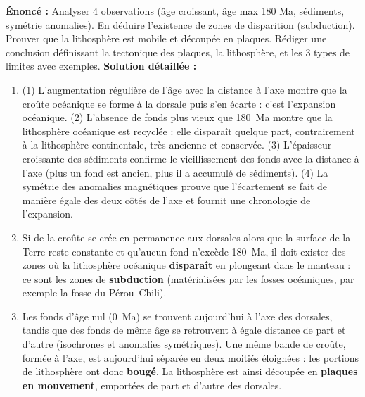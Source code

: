 \documentclass[11pt]{article}
\begin{document}
\begin{corrige}
\textbf{Énoncé :} Analyser 4 observations (âge croissant, âge max 180 Ma, sédiments, symétrie anomalies). En déduire l'existence de zones de disparition (subduction). Prouver que la lithosphère est mobile et découpée en plaques. Rédiger une conclusion définissant la tectonique des plaques, la lithosphère, et les 3 types de limites avec exemples.
\tcblower
\textbf{Solution détaillée :}
\begin{enumerate}
\item (1) L'augmentation régulière de l'âge avec la distance à l'axe montre que la croûte océanique se forme à la dorsale puis s'en écarte : c'est l'expansion océanique. (2) L'absence de fonds plus vieux que \SI{180}{Ma} montre que la lithosphère océanique est recyclée : elle disparaît quelque part, contrairement à la lithosphère continentale, très ancienne et conservée. (3) L'épaisseur croissante des sédiments confirme le vieillissement des fonds avec la distance à l'axe (plus un fond est ancien, plus il a accumulé de sédiments). (4) La symétrie des anomalies magnétiques prouve que l'écartement se fait de manière égale des deux côtés de l'axe et fournit une chronologie de l'expansion.
\item Si de la croûte se crée en permanence aux dorsales alors que la surface de la Terre reste constante et qu'aucun fond n'excède \SI{180}{Ma}, il doit exister des zones où la lithosphère océanique \textbf{disparaît} en plongeant dans le manteau : ce sont les zones de \textbf{subduction} (matérialisées par les fosses océaniques, par exemple la fosse du Pérou--Chili).
\item Les fonds d'âge nul (\SI{0}{Ma}) se trouvent aujourd'hui à l'axe des dorsales, tandis que des fonds de même âge se retrouvent à égale distance de part et d'autre (isochrones et anomalies symétriques). Une même bande de croûte, formée à l'axe, est aujourd'hui séparée en deux moitiés éloignées : les portions de lithosphère ont donc \textbf{bougé}. La lithosphère est ainsi découpée en \textbf{plaques en mouvement}, emportées de part et d'autre des dorsales.

\end{enumerate}
\end{corrige}
\end{document}
